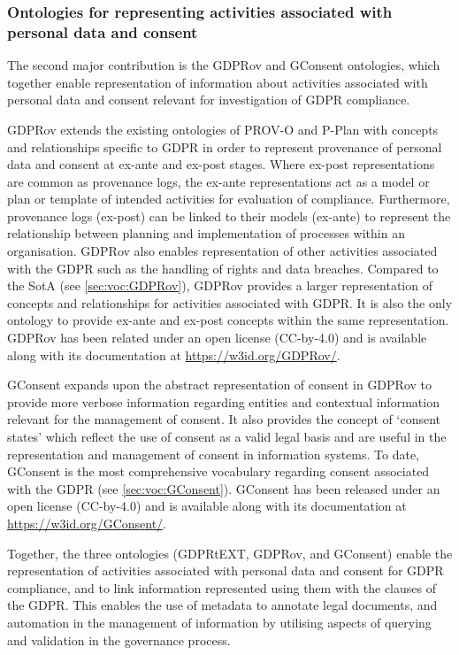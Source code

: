 \subsubsection*{Ontologies for representing activities associated with personal data and consent}
The second major contribution is the GDPRov and GConsent ontologies, which together enable representation of information about activities associated with personal data and consent relevant for investigation of GDPR compliance.

GDPRov extends the existing ontologies of PROV-O and P-Plan with concepts and relationships specific to GDPR in order to represent provenance of personal data and consent at ex-ante and ex-post stages. Where ex-post representations are common as provenance logs, the ex-ante representations act as a model or plan or template of intended activities for evaluation of compliance. Furthermore, provenance logs (ex-post) can be linked to their models (ex-ante) to represent the relationship between planning and implementation of processes within an organisation. GDPRov also enables representation of other activities associated with the GDPR such as the handling of rights and data breaches.
Compared to the SotA (see \autoref{sec:voc:GDPRov}), GDPRov provides a larger representation of concepts and relationships for activities associated with GDPR.
It is also the only ontology to provide ex-ante and ex-post concepts within the same representation.
GDPRov has been related under an open license (CC-by-4.0) and is available along with its documentation at \url{https://w3id.org/GDPRov/}.

GConsent expands upon the abstract representation of consent in GDPRov to provide more verbose information regarding entities and contextual information relevant for the management of consent. It also provides the concept of `consent states' which reflect the use of consent as a valid legal basis and are useful in the  representation and management of consent in information systems. To date, GConsent is the most comprehensive vocabulary regarding consent associated with the GDPR (see \autoref{sec:voc:GConsent}).
GConsent has been released under an open license (CC-by-4.0) and is available along with its documentation at \url{https://w3id.org/GConsent/}.

Together, the three ontologies (GDPRtEXT, GDPRov, and GConsent) enable the representation of activities associated with personal data and consent for GDPR compliance, and to link information represented using them with the clauses of the GDPR.
This enables the use of metadata to annotate legal documents, and automation in the management of information by utilising aspects of querying and validation in the governance process.


